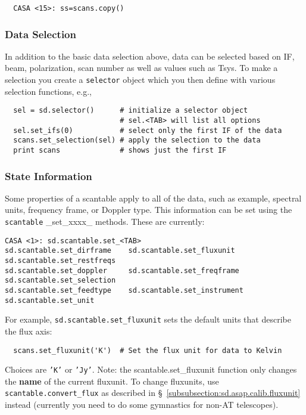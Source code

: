 \small
\begin{verbatim}
  CASA <15>: ss=scans.copy()
\end{verbatim}
\normalsize

\subsubsection{Data Selection}
\label{subsubsection:sd.asap.scantable.select}

In addition to the basic data selection above, data can be selected
based on IF, beam, polarization, scan number as well as values such as
Tsys.  To make a selection you create a {\tt selector} object which
you then define with various selection functions, e.g.,

\small
\begin{verbatim}
  sel = sd.selector()      # initialize a selector object
                           # sel.<TAB> will list all options
  sel.set_ifs(0)           # select only the first IF of the data
  scans.set_selection(sel) # apply the selection to the data
  print scans              # shows just the first IF
\end{verbatim}
\normalsize

\subsubsection{State Information}
\label{subsubsection:sd.asap.scantable.state}

Some properties of a scantable apply to all of the data, such as
example, spectral units, frequency frame, or Doppler type. This
information can be set using the {\tt scantable} \_set\_xxxx\_
methods.  These are currently:
\small
\begin{verbatim}
CASA <1>: sd.scantable.set_<TAB>
sd.scantable.set_dirframe    sd.scantable.set_fluxunit    sd.scantable.set_restfreqs   
sd.scantable.set_doppler     sd.scantable.set_freqframe   sd.scantable.set_selection   
sd.scantable.set_feedtype    sd.scantable.set_instrument  sd.scantable.set_unit
\end{verbatim}
\normalsize

For example, {\tt sd.scantable.set\_fluxunit} sets the default units
that describe the flux axis:
\small
\begin{verbatim}
  scans.set_fluxunit('K')  # Set the flux unit for data to Kelvin
\end{verbatim}
\normalsize
Choices are {\tt 'K'} or {\tt 'Jy'}.
Note: the scantable.set\_fluxunit function only changes the {\bf name}
of the current fluxunit. To change fluxunits, use 
{\tt scantable.convert\_flux} as described in 
\S~\ref{subsubsection:sd.asap.calib.fluxunit}
instead (currently you need to do some gymnastics for non-AT
telescopes).

